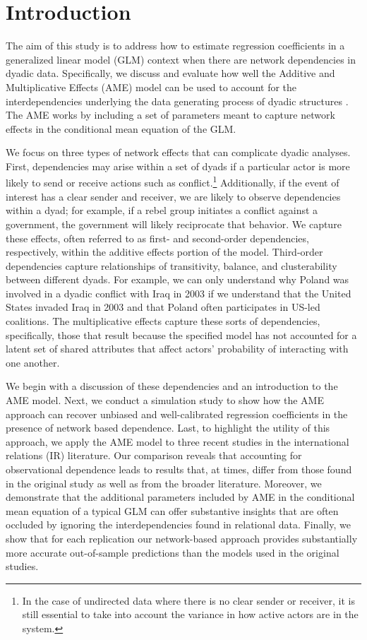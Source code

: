 \section{\textbf{Introduction}}

The aim of this study is to address how to estimate regression coefficients in a generalized linear model (GLM) context when there are network dependencies in dyadic data. Specifically, we discuss and evaluate how well the Additive and Multiplicative Effects (AME) model can be used to account for the interdependencies underlying the data generating process of dyadic structures \citep{hoff:2005,hoff:2008,minhas:etal:2019}. The AME works by including a set of parameters meant to capture network effects in the conditional mean equation of the GLM.

We focus on three types of network effects that can complicate dyadic analyses. First, dependencies may arise within a set of dyads if a particular actor is more likely to send or receive actions such as conflict.\footnote{In the case of undirected data where there is no clear sender or receiver, it is still essential to take into account the variance in how active actors are in the system.} Additionally, if the event of interest has a clear sender and receiver, we are likely to observe dependencies within a dyad; for example, if a rebel group initiates a conflict against a government, the government will likely reciprocate that behavior. We capture these effects, often referred to as first- and second-order dependencies, respectively, within the additive effects portion of the model. Third-order dependencies capture relationships of transitivity, balance, and clusterability between different dyads. For example, we can only understand why Poland was involved in a dyadic conflict with Iraq in 2003 if we understand that the United States invaded Iraq in 2003 and that Poland often participates in US-led coalitions. The multiplicative effects capture these sorts of dependencies, specifically, those that result because the specified model has not accounted for a latent set of shared attributes that affect actors' probability of interacting with one another.

We begin with a discussion of these dependencies and an introduction to the AME model. Next, we conduct a simulation study to show how the AME approach can recover unbiased and well-calibrated regression coefficients in the presence of network based dependence. Last, to highlight the utility of this approach, we apply the AME model to three recent studies in the international relations (IR) literature. Our comparison reveals that accounting for observational dependence leads to results that, at times, differ from those found in the original study as well as from the broader literature. Moreover, we demonstrate that the additional parameters included by AME in the conditional mean equation of a typical GLM can offer substantive insights that are often occluded by ignoring the interdependencies found in relational data. Finally, we show that for each replication our network-based approach provides substantially more accurate out-of-sample predictions than the models used in the original studies.

